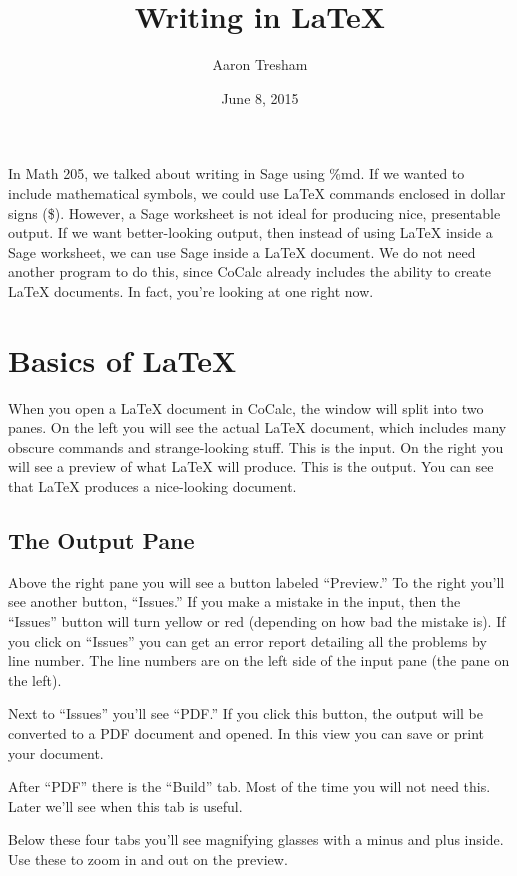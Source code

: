 \documentclass[12pt]{article}
\title{Writing in \LaTeX}
\author{Aaron Tresham}
\date{June 8, 2015}
\begin{document}
\maketitle
\newcommand{\ds}{\displaystyle}

In Math 205, we talked about writing in Sage using \%md. If we wanted to include mathematical symbols, we could use \LaTeX{} commands enclosed in dollar signs (\$). However, a Sage worksheet is not ideal for producing nice, presentable output. If we want better-looking output, then instead of using \LaTeX{} inside a Sage worksheet, we can use Sage inside a \LaTeX{} document. We do not need another program to do this, since CoCalc already includes the ability to create \LaTeX{} documents. In fact, you're looking at one right now.

\section{Basics of \LaTeX}

When you open a \LaTeX{} document in CoCalc, the window will split into two panes. On the left you will see the actual \LaTeX{} document, which includes many obscure commands and strange-looking stuff. This is the input. On the right you will see a preview of what \LaTeX{} will produce. This is the output. You can see that \LaTeX{} produces a nice-looking document.

\subsection{The Output Pane}

Above the right pane you will see a button labeled ``Preview.'' To the right you'll see another button, ``Issues.'' If you make a mistake in the input, then the ``Issues'' button will turn yellow or red (depending on how bad the mistake is). If you click on ``Issues'' you can get an error report detailing all the problems by line number. The line numbers are on the left side of the input pane (the pane on the left).

Next to ``Issues'' you'll see ``PDF.'' If you click this button, the output will be converted to a PDF document and opened. In this view you can save or print your document.

After ``PDF'' there is the ``Build'' tab. Most of the time you will not need this. Later we'll see when this tab is useful.

Below these four tabs you'll see magnifying glasses with a minus and plus inside. Use these to zoom in and out on the preview.
\end{document}
